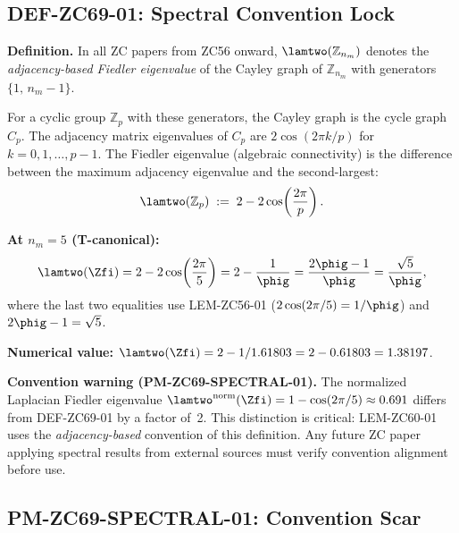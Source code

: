 \documentclass[12pt, a4paper]{article}
\begin{document}
\newpage

\subsection{DEF-ZC69-01: Spectral Convention Lock}
\label{sec:def01}


\begin{formalbox}[title={DEF-ZC69-01: Adjacency-Based Fiedler Convention
  for $\mathbb{Z}_{n_m}$ ($R_0$, Exact)}]

\textbf{Definition.}
In all ZC papers from ZC56 onward, $\lamtwo(\mathbb{Z}_{n_m})$
denotes the \emph{adjacency-based Fiedler eigenvalue} of
the Cayley graph of $\mathbb{Z}_{n_m}$ with generators
$\{1,\, n_m - 1\}$.

For a cyclic group $\mathbb{Z}_p$ with these generators,
the Cayley graph is the cycle graph $C_p$.
The adjacency matrix eigenvalues of $C_p$ are
$2\cos(2\pi k/p)$ for $k = 0, 1, \ldots, p-1$.
The Fiedler eigenvalue (algebraic connectivity)
is the difference between the maximum adjacency eigenvalue
and the second-largest:
\begin{equation}
  \lamtwo(\mathbb{Z}_p)
  \;:=\;
  2 - 2\cos\!\left(\frac{2\pi}{p}\right).
  \label{eq:lam-def}
\end{equation}

\textbf{At $n_m = 5$ (T-canonical):}
\[
  \lamtwo(\Zfi)
  = 2 - 2\cos\!\left(\frac{2\pi}{5}\right)
  = 2 - \frac{1}{\phig}
  = \frac{2\phig - 1}{\phig}
  = \frac{\sqrt{5}}{\phig},
\]
where the last two equalities use LEM-ZC56-01
($2\cos(2\pi/5) = 1/\phig$) and $2\phig - 1 = \sqrt{5}$.

\textbf{Numerical value:}
$\lamtwo(\Zfi) = 2 - 1/1.61803 = 2 - 0.61803 = 1.38197$.

\textbf{Convention warning (PM-ZC69-SPECTRAL-01).}
The normalized Laplacian Fiedler eigenvalue
$\lamtwo^{\rm norm}(\Zfi) = 1 - \cos(2\pi/5) \approx 0.691$
differs from DEF-ZC69-01 by a factor of~2.
This distinction is critical: LEM-ZC60-01 uses the
\emph{adjacency-based} convention of this definition.
Any future ZC paper applying spectral results from
external sources must verify convention alignment before use.
\end{formalbox}

\subsection{PM-ZC69-SPECTRAL-01: Convention Scar}
\label{sec:pm}
\end{document}
